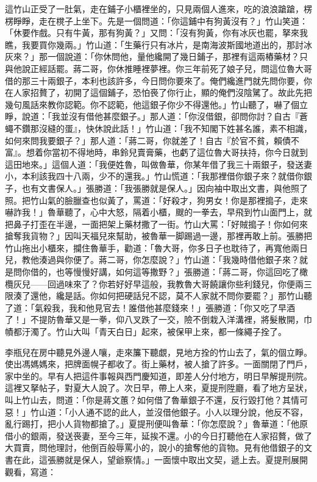 這竹山正受了一肚氣，走在鋪子小櫃裡坐的，只見兩個人進來，吃的浪浪蹌蹌，楞楞睜睜，走在櫈子上坐下。{}先是一個問道：「你這鋪中有狗黃沒有？」竹山笑道：「休要作戲。只有牛黃，那有狗黃？」又問：「沒有狗黃，你有冰灰也罷，拏來我瞧，我要買你幾兩。」竹山道：「生藥行只有冰片，是南海波斯國地道出的，那討冰灰來？」那一個說道：「你休問他，量他纔開了幾日鋪子，那裡有這兩樁藥材？只與他說正經話罷。蔣二哥，你休推睡裡夢裡。你三年前死了娘子兒，問這位魯大哥借的那三十兩銀子，本利也該許多，今日問你要來了。俺們纔進門就先問你要，你在人家招贅了，初開了這個鋪子，恐怕䘮了你行止，顯的俺們沒陰騭了。故此先把幾句風話來教你認範。你不認範，他這銀子你少不得還他。」竹山聽了，嚇了個立睜，說道：「我並沒有借他甚麼銀子。」那人道：「你沒借銀，卻問你討？自古『蒼蠅不鑽那沒縫的蛋』，快休說此話！」竹山道：「我不知閣下姓甚名誰，素不相識，如何來問我要銀子？」那人道：「蔣二哥，你就差了！自古『於官不貧，賴債不富』。想着你當初不得地時，串鈴兒賣膏藥，{}也虧了這位魯大哥扶持，你今日就到這田地來。」這個人道：「我便姓魯，叫做魯華，{}你某年借了我三十兩銀子，發送妻小，本利該我四十八兩，少不的還我。」竹山慌道：「我那裡借你銀子來？就借你銀子，也有文書保人。」張勝道：「我張勝就是保人。」因向袖中取出文書，與他照了照。把竹山氣的臉臘查也似黃了，罵道：「好殺才，狗男女！你是那裡搗子，走來嚇詐我！」魯華聽了，心中大怒，隔着小櫃，颼的一拳去，早飛到竹山面門上，就把鼻子打歪在半邊，一面把架上藥材撒了一街。竹山大罵：「好賊搗子！你如何來搶奪我貨物？」因叫天福兒來幫助，被魯華一脚踢過一邊，那裡再敢上前。張勝把竹山拖出小櫃來，攔住魯華手，勸道：「魯大哥，你多日子也耽待了，再寬他兩日兒，教他湊過與你便了。蔣二哥，你怎麼說？」竹山道：「我幾時借他銀子來？就是問你借的，也等慢慢好講，如何這等撒野？」張勝道：「蔣二哥，你這回吃了橄欖灰兒——回過味來了？你若好好早這般，我教魯大哥饒讓你些利錢兒，你便兩三限湊了還他，纔是話。你如何把硬話兒不認，莫不人家就不問你要罷？」那竹山聽了道：「氣殺我，我和他見官去！誰借他甚麼錢來！」張勝道：「你又吃了早酒了！」不提防魯華又是一拳，仰八叉跌了一交，險不倒栽入洋溝裡，將髮散開，巾幘都汙濁了。竹山大叫「青天白日」起來，被保甲上來，都一條繩子拴了。

李瓶兒在房中聽見外邊人嚷，走來簾下聽覷，見地方拴的竹山去了，氣的個立睜。使出馮媽媽來，把牌面幌子都收了。街上藥材，被人搶了許多。一面關閉了門戶，家中坐的。早有人把這件事報與西門慶知道，即差人分付地方，明日早解提刑院。這裡又拏帖子，對夏大人說了。次日早，帶上人來，夏提刑陞廳，看了地方呈狀，叫上竹山去，問道：「你是蔣文蕙？如何借了魯華銀子不還，反行毀打他？其情可惡！」竹山道：「小人通不認的此人，並沒借他銀子。小人以理分說，他反不容，亂行踢打，把小人貨物都搶了。」夏提刑便叫魯華：「你怎麼說？」魯華道：「他原借小的銀兩，發送䘮妻，至今三年，延挨不還。小的今日打聽他在人家招贅，做了大買賣，問他理討，他倒百般辱罵小的，說小的搶奪他的貨物。見有他借銀子的文書在此，這張勝就是保人，望爺察情。」一面懷中取出文契，遞上去。夏提刑展開觀看，寫道：

